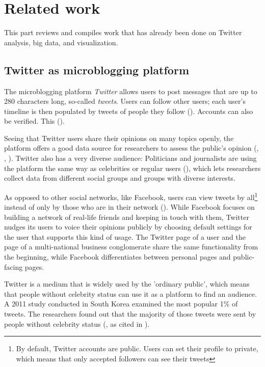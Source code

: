 \section{Related work}
This part reviews and compiles work that has already been done on Twitter analysis, big data, and visualization.

\subsection{Twitter as microblogging platform}
The microblogging platform \emph{Twitter} allows users to post messages that are up to 280 characters long, so-called \emph{tweets}. Users can follow other users; each user's timeline is then populated by tweets of people they follow (\cite{thimmTwitterAlsWahlkampfmedium2012}). Accounts can also be verified. This  (\cite{twitterinc.VerifiedAccounts}).

Seeing that Twitter users share their opinions on many topics openly, the platform offers a good data source for researchers to assess the public's opinion (\cite{pak2010twitter}, \cite{pfaffenberger2016twitter}, \cite{broniatowski2014twitter}). Twitter also has a very diverse audience: Politicians and journalists are using the platform the same way as celebrities or regular users (\cite{pak2010twitter}), which lets researchers collect data from different social groups and groups with diverse interests.

As opposed to other social networks, like Facebook, users can view tweets by all\footnote{By default, Twitter accounts are public. Users can set their profile to private, which means that only accepted followers can see their tweets} instead of only by those who are in their network (\cite{parkDoesTwitterMotivate2013}). While Facebook focuses on building a network of real-life friends and keeping in touch with them, Twitter nudges its users to voice their opinions publicly by choosing default settings for the user that supports this kind of usage. The Twitter page of a user and the page of a multi-national business conglomerate share the same functionality from the beginning, while Facebook differentiates between personal pages and public-facing pages.

Twitter is a medium that is widely used by the 'ordinary public', which means that people without celebrity status can use it as a platform to find an audience. A 2011 study conducted in South Korea examined the most popular 1\% of tweets. The researchers found out that the majority of those tweets were sent by people without celebrity status (\cite{chang2011structure}, as cited in \cite{parkDoesTwitterMotivate2013}).

